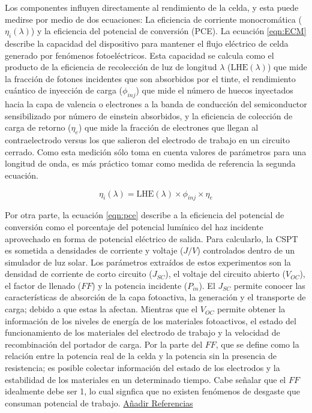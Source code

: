 
Los componentes influyen directamente al rendimiento de la celda, y esta puede medirse por medio de dos ecuaciones: La eficiencia de corriente monocromática ($\eta_{i} (\lambda)$) y la eficiencia del potencial de conversión (PCE). La  ecuación \ref{eqn:ECM} describe la capacidad del dispositivo para mantener el flujo eléctrico de celda generado por fenómenos fotoeléctricos. Esta capacidad se calcula como el producto de la eficiencia de recolección de luz de longitud $\lambda$ ($\text{LHE}(\lambda)$) que mide la fracción de fotones incidentes que son absorbidos por el tinte, el rendimiento cuántico de inyección de carga ($\phi_{inj}$) que mide el número de huecos inyectados hacia la capa de valencia o electrones a la banda de conducción del semiconductor sensibilizado por número de einstein absorbidos, y la eficiencia de colección de carga de retorno ($\eta_e$) que mide la fracción de electrones que llegan al contraelectrodo versus los que salieron del electrodo de trabajo en un circuito cerrado. Como esta medición sólo toma en cuenta valores de parámetros para una longitud de onda, es más práctico tomar como medida de referencia la segunda ecuación.


\begin{equation}
    \eta_{i}(\lambda) = \text{LHE}(\lambda)\times \phi_{inj} \times \eta_e
    \label{eqn:ECM}
\end{equation}

Por otra parte, la  ecuación \ref{eqn:pce} describe a la eficiencia del potencial de conversión como el porcentaje del potencial lumínico del haz incidente aprovechado en forma de potencial eléctrico de salida. Para calcularlo, la CSPT es sometida a densidades de corriente y voltaje ($J/V$) controlados dentro de un simulador de luz solar. Los parámetros extraídos de estos experimentos son la densidad de corriente de corto circuito ($J_{SC}$), el voltaje del circuito abierto ($V_{OC}$), el factor de llenado ($FF$) y la potencia incidente ($P_{in}$). El $J_{SC}$ permite conocer las características de absorción de la capa fotoactiva, la generación y el transporte de carga; debido a que estas la afectan. Mientras que el $V_{OC}$ permite obtener la información de los niveles de energía de los materiales fotoactivos, el estado del funcionamiento de los materiales del electrodo de trabajo y la velocidad de recombinación del portador de carga. Por la parte del $FF$, que se define como la relación entre la potencia real de la celda y la potencia sin la presencia de resistencia; es posible colectar información del estado de los electrodos y la estabilidad de los materiales en un determinado tiempo. Cabe señalar que el $FF$ idealmente debe ser 1, lo cual signfica que no existen fenómenos de desgaste que consuman potencial de trabajo. \underline{Añadir Referencias}

